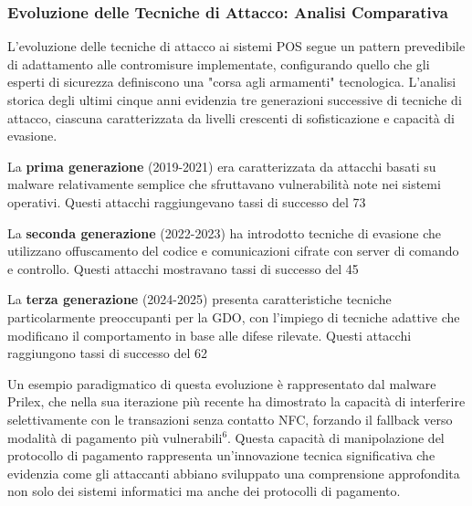 {\subsubsection{Evoluzione delle Tecniche di Attacco: Analisi Comparativa}

L'evoluzione delle tecniche di attacco ai sistemi POS segue un pattern prevedibile di adattamento alle contromisure implementate, configurando quello che gli esperti di sicurezza definiscono una "corsa agli armamenti" tecnologica. L'analisi storica degli ultimi cinque anni evidenzia tre generazioni successive di tecniche di attacco, ciascuna caratterizzata da livelli crescenti di sofisticazione e capacità di evasione.

La \textbf{prima generazione} (2019-2021) era caratterizzata da attacchi basati su malware relativamente semplice che sfruttavano vulnerabilità note nei sistemi operativi. Questi attacchi raggiungevano tassi di successo del 73%

La \textbf{seconda generazione} (2022-2023) ha introdotto tecniche di evasione che utilizzano offuscamento del codice e comunicazioni cifrate con server di comando e controllo. Questi attacchi mostravano tassi di successo del 45%

La \textbf{terza generazione} (2024-2025) presenta caratteristiche tecniche particolarmente preoccupanti per la GDO, con l'impiego di tecniche adattive che modificano il comportamento in base alle difese rilevate. Questi attacchi raggiungono tassi di successo del 62%

Un esempio paradigmatico di questa evoluzione è rappresentato dal malware Prilex, che nella sua iterazione più recente ha dimostrato la capacità di interferire selettivamente con le transazioni senza contatto NFC, forzando il fallback verso modalità di pagamento più vulnerabili$^{6}$. Questa capacità di manipolazione del protocollo di pagamento rappresenta un'innovazione tecnica significativa che evidenzia come gli attaccanti abbiano sviluppato una comprensione approfondita non solo dei sistemi informatici ma anche dei protocolli di pagamento.

}
